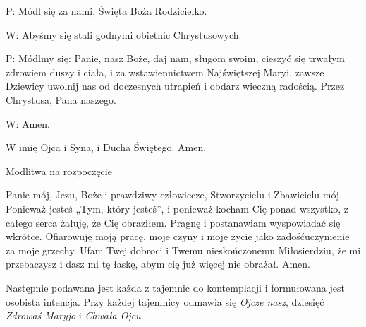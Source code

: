 ﻿\documentclass[9pt,twoside]{extarticle}
\begin{document}
{\hnr P:} Módl się za nami, Święta Boża Rodzicielko.


{\hnr W:} Abyśmy się stali godnymi obietnic Chrystusowych.


{\hnr P:} Módlmy się: Panie, nasz Boże, daj nam, sługom swoim, cieszyć się trwałym zdrowiem duszy i ciała, i za wstawiennictwem Najświętszej Maryi, zawsze Dziewicy uwolnij nas od doczesnych utrapień i obdarz wieczną radością. Przez Chrystusa, Pana naszego.


{\hnr W:} Amen.


{\hnr{}}


W imię Ojca i Syna, i Ducha Świętego. Amen.


{\hnr Modlitwa na rozpoczęcie}


Panie mój, Jezu, Boże i prawdziwy człowiecze, Stworzycielu i Zbawicielu mój.
Ponieważ jesteś „Tym, który jesteś”, i ponieważ kocham Cię ponad wszystko,
z całego serca żałuję, że Cię obraziłem. Pragnę i postanawiam wyspowiadać się wkrótce. Ofiarowuję moją pracę, moje czyny i moje życie jako zadośćuczynienie za moje grzechy. Ufam Twej dobroci i Twemu nieskończonemu Miłosierdziu, że mi przebaczysz i dasz mi tę łaskę, abym cię już więcej nie obrażał. Amen.


{\hnr Następnie podawana jest każda z tajemnic do kontemplacji i formułowana jest osobista intencja. Przy każdej tajemnicy odmawia się {\em Ojcze nasz}, dziesięć {\em Zdrowaś Maryjo} i {\em Chwała Ojcu}.}
\end{document}
